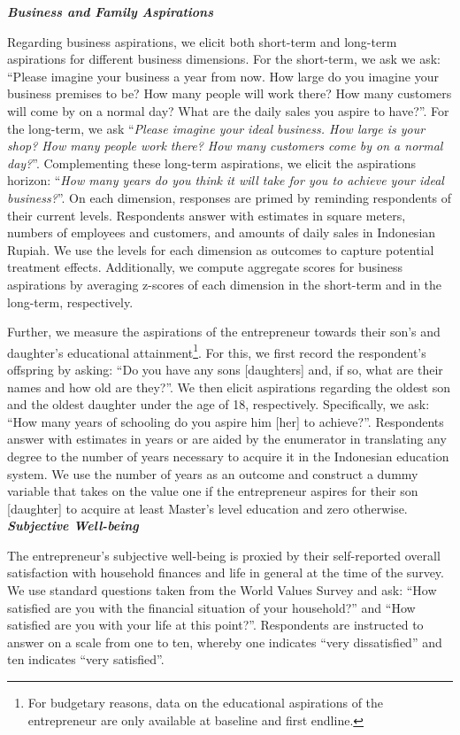 \documentclass[11.5pt]{article}
\begin{document}
\textbf{\emph{Business and Family Aspirations}}

Regarding business aspirations, we elicit both short-term and long-term aspirations for different business dimensions. For the short-term, we ask we ask: ``Please imagine your business a year from now. How large do you imagine your business premises to be? How many people will work there? How many customers will come by on a normal day? What are the daily sales you aspire to have?''. For the long-term, we ask ``\emph{Please imagine your ideal business. How large is your shop? How many people work there? How many customers come by on a normal day?}''. Complementing these long-term aspirations, we elicit the aspirations horizon: ``\emph{How many years do you think it will take for you to achieve your ideal business?}''. On each dimension, responses are primed by reminding respondents of their current levels. Respondents answer with estimates in square meters, numbers of employees and customers, and amounts of daily sales in Indonesian Rupiah. We use the levels for each dimension as outcomes to capture potential treatment effects. Additionally, we compute aggregate scores for business aspirations by averaging z-scores of each dimension in the short-term and in the long-term, respectively. 

Further, we measure the aspirations of the entrepreneur towards their son's and daughter's educational attainment\footnote{For budgetary reasons, data on the educational aspirations of the entrepreneur are only available at baseline and first endline.}. For this, we first record the respondent's offspring by asking: ``Do you have any sons [daughters] and, if so, what are their names and how old are they?''. We then elicit aspirations regarding the oldest son and the oldest daughter under the age of 18, respectively. Specifically, we ask: ``How many years of schooling do you aspire him [her] to achieve?''. Respondents answer with estimates in years or are aided by the enumerator in translating any degree to the number of years necessary to acquire it in the Indonesian education system. We use the number of years as an outcome and construct a dummy variable that takes on the value one if the entrepreneur aspires for their son [daughter] to acquire at least Master's level education and zero otherwise. \\

\textbf{\emph{Subjective Well-being}}

The entrepreneur's subjective well-being is proxied by their self-reported overall satisfaction with household finances and life in general at the time of the survey. We use standard questions taken from the World Values Survey and ask: ``How satisfied are you with the financial situation of your household?'' and ``How satisfied are you with your life at this point?''. Respondents are instructed to answer on a scale from one to ten, whereby one indicates ``very dissatisfied'' and ten indicates ``very satisfied''. \\
\end{document}
